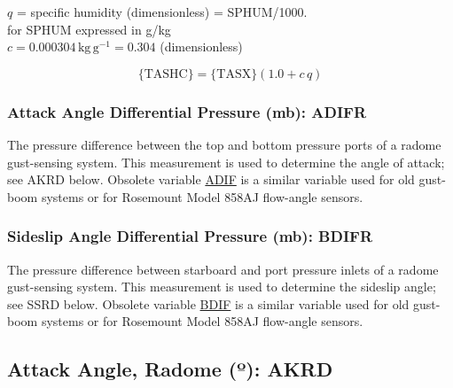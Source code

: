 \documentclass[
  english,
]{book}
\begin{document}
\(q\) = specific humidity (dimensionless) = SPHUM/1000.\\
\hspace*{0.333em}\hspace*{0.333em}\hspace*{0.333em}\hspace*{0.333em}\hspace*{0.333em}\hspace*{0.333em} for SPHUM expressed in g/kg\\
\(c=0.000304\,\mathrm{kg\,g^{-1}}=0.304\) (dimensionless)

\begin{equation}
\mathrm{\{TASHC\}} = \mathrm{\{TASX\}} (1.0 + c\,q)  
\label{eq:TASHC}
\end{equation}

\hypertarget{adifr}{%
\subsubsection*{Attack Angle Differential Pressure (mb): ADIFR}\label{adifr}}

The pressure difference between the top and bottom pressure ports of a radome gust-sensing system. This measurement is used to determine the angle of attack; see AKRD below. Obsolete variable \underline{ADIF} is a similar variable used for old gust-boom systems or for Rosemount Model 858AJ flow-angle sensors.

\hypertarget{bdifr}{%
\subsubsection*{Sideslip Angle Differential Pressure (mb): BDIFR}\label{bdifr}}

The pressure difference between starboard and port pressure inlets of a radome gust-sensing system. This measurement is used to determine the sideslip angle; see SSRD below. Obsolete variable \underline{BDIF} is a similar variable used for old gust-boom systems or for Rosemount Model 858AJ flow-angle sensors.

\hypertarget{akrd}{%
\subsection*{\texorpdfstring{Attack Angle, Radome ({º}): AKRD}{Attack Angle, Radome (º): AKRD}}\label{akrd}}
\end{document}
